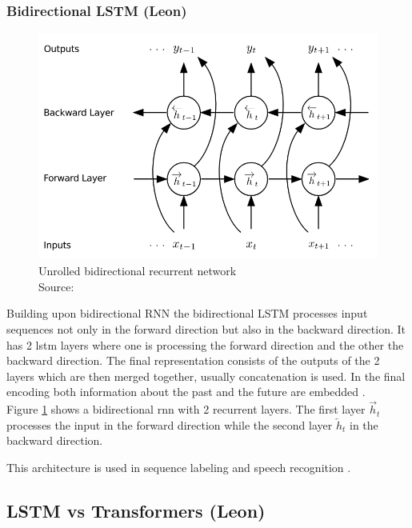 \documentclass[twoside,a4paper,10pt,DIV=12,BCOR=12mm]{scrartcl}
\begin{document}
\pagebreak

\subsubsection{Bidirectional LSTM (Leon)}

\begin{figure}[h!]
    \centering
    \includegraphics[height=7.5cm]{./pictures/brnn.png}
    \caption{Unrolled bidirectional recurrent network\\ Source: \cite{graves2013speechrecognitiondeeprecurrent}}
    \label{fig:brnn}
\end{figure}

Building upon bidirectional RNN \cite{Schuster97} the bidirectional LSTM processes input sequences not only in the 
forward direction but also in the backward direction. It has 2 lstm layers where one is processing the forward direction
and the other the backward direction. The final representation consists of the outputs of the 2 layers which are then merged together,
usually concatenation is used. In the final encoding both information about the past and the future are embedded \cite{Graves05}.\\
Figure \ref{fig:brnn} shows a bidirectional rnn with 2 recurrent layers. The first layer $\overrightarrow{h}_t$ processes
the input in the forward direction while the second layer $\overleftarrow{h}_t$ in the backward direction.



This architecture is used in sequence labeling \cite{huang2015bidirectionallstmcrfmodelssequence} and speech recognition \cite{graves2013speechrecognitiondeeprecurrent}.

\subsection{LSTM vs Transformers (Leon)}
\end{document}
